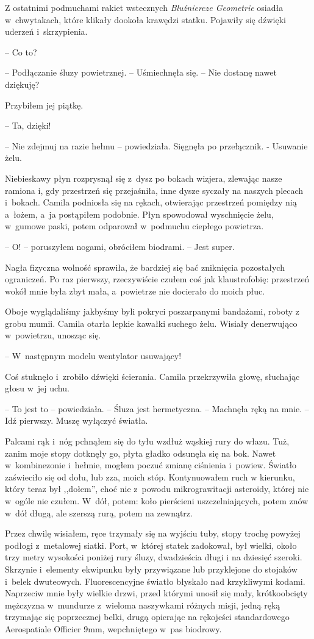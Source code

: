 \documentclass[oneside,polish,12pt,sfheadings]{mwbk}
\begin{document}
Z ostatnimi podmuchami rakiet wstecznych \emph{Bluźniercze Geometrie}
osiadła w~chwytakach, które klikały dookoła krawędzi statku. Pojawiły
się dźwięki uderzeń i~skrzypienia.

-- Co to?

-- Podłączanie śluzy powietrznej. -- Uśmiechnęła się. -- Nie dostanę nawet
dziękuję?

Przybiłem jej piątkę. 

-- Ta, dzięki!

-- Nie zdejmuj na razie hełmu -- powiedziała. Sięgnęła po przełącznik. -
Usuwanie żelu.

Niebieskawy płyn rozprysnął się z~dysz po bokach wizjera, zlewając nasze
ramiona i, gdy przestrzeń się przejaśniła, inne dysze syczały na naszych
plecach i~bokach. Camila podniosła się na rękach, otwierając przestrzeń
pomiędzy nią a~łożem, a~ja postąpiłem podobnie. Płyn spowodował
wyschnięcie żelu, w~gumowe paski, potem odparował w~podmuchu ciepłego
powietrza.

-- O! -- poruszyłem nogami, obróciłem biodrami. -- Jest super.

Nagła fizyczna wolność sprawiła, że bardziej się bać zniknięcia
pozostałych ograniczeń. Po raz pierwszy, rzeczywiście czułem coś jak
klaustrofobię: przestrzeń wokół mnie była zbyt mała, a~powietrze nie
docierało do moich płuc.

Oboje wyglądaliśmy jakbyśmy byli pokryci poszarpanymi bandażami, roboty
z grobu mumii. Camila otarła lepkie kawałki suchego żelu. Wisiały
denerwująco w~powietrzu, unosząc się.

-- W~następnym modelu wentylator usuwający!

Coś stuknęło i~zrobiło dźwięki ścierania. Camila przekrzywiła głowę,
słuchając głosu w~jej uchu.

-- To jest to -- powiedziała. -- Śluza jest hermetyczna. -- Machnęła ręką na
mnie. -- Idź pierwszy. Muszę wyłączyć światła.

Palcami rąk i~nóg pchnąłem się do tyłu wzdłuż wąskiej rury do włazu.
Tuż, zanim moje stopy dotknęły go, płyta gładko odsunęła się na bok.
Nawet w~kombinezonie i~hełmie, mogłem poczuć zmianę ciśnienia i~powiew.
Światło zaświeciło się od dołu, lub zza, moich stóp. Kontynuowałem ruch
w kierunku, który teraz był ,,dołem'', choć nie z~powodu mikrograwitacji
asteroidy, której nie w~ogóle nie czułem. W~dół, potem: koło pierścieni
uszczelniających, potem znów w~dół długą, ale szerszą rurą, potem na
zewnątrz.

Przez chwilę wisiałem, ręce trzymały się na wyjściu tuby, stopy trochę
powyżej podłogi z~metalowej siatki. Port, w~której statek zadokował, był
wielki, około trzy metry wysokości poniżej rury śluzy, dwadzieścia długi
i na dziesięć szeroki. Skrzynie i~elementy ekwipunku były przywiązane
lub przyklejone do stojaków i~belek dwuteowych. Fluorescencyjne światło
błyskało nad krzykliwymi kodami. Naprzeciw mnie były wielkie drzwi,
przed którymi unosił się mały, krótkoobcięty mężczyzna w~mundurze z~wieloma naszywkami różnych misji, jedną ręką trzymając się poprzecznej
belki, drugą opierając na rękojeści standardowego Aerospatiale Officier
9mm, wepchniętego w~pas biodrowy.
\end{document}
